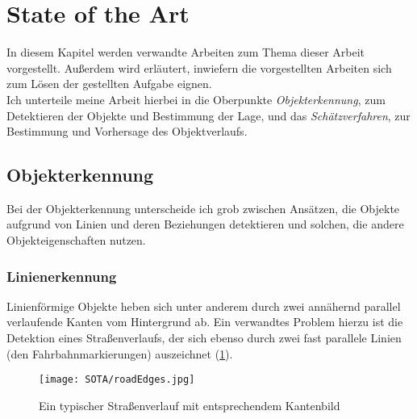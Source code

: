 \section{State of the Art}
In diesem Kapitel werden verwandte Arbeiten zum Thema dieser Arbeit vorgestellt. Außerdem wird erläutert, inwiefern die vorgestellten Arbeiten sich zum Lösen der gestellten Aufgabe eignen.\\
Ich unterteile meine Arbeit hierbei in die Oberpunkte \textit{Objekterkennung}, zum Detektieren der Objekte und Bestimmung der Lage, und das \textit{Schätzverfahren}, zur Bestimmung und Vorhersage des Objektverlaufs.
\subsection{Objekterkennung}
Bei der Objekterkennung unterscheide ich grob zwischen Ansätzen, die Objekte aufgrund von Linien und deren Beziehungen detektieren und solchen, die andere Objekteigenschaften nutzen.
\subsubsection{Linienerkennung}
Linienförmige Objekte heben sich unter anderem durch zwei annähernd parallel verlaufende Kanten vom Hintergrund ab.
Ein verwandtes Problem hierzu ist die Detektion eines Straßenverlaufs, der sich ebenso durch zwei fast parallele Linien (den Fahrbahnmarkierungen) auszeichnet (\ref{Abb. 4}).\\
\begin{figure}[H]
	\texttt{[image: SOTA/roadEdges.jpg]}
	\caption{Ein typischer Straßenverlauf mit entsprechendem Kantenbild}
	\label{Abb. 4}
\end{figure}


